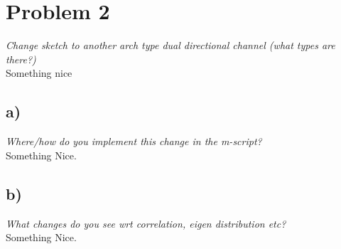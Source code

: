 \section{Problem 2}
\textit{Change sketch to another arch type dual directional channel (what types are there?)}\\

Something nice

\subsection{a)}
\textit{Where/how do you implement this change in the m-script?}\\

Something Nice. 

\subsection{b)}
\textit{What changes do you see wrt correlation, eigen distribution etc?}\\

Something Nice. 